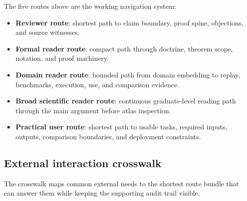 The five routes above are the working navigation system:
\begin{itemize}[leftmargin=1.6em,nosep]
\item \textbf{Reviewer route}: shortest path to claim boundary, proof spine,
      objections, and source witnesses.
\item \textbf{Formal reader route}: compact path through doctrine, theorem
      scope, notation, and proof machinery.
\item \textbf{Domain reader route}: bounded path from domain embedding to
      replay, benchmarks, execution, use, and comparison evidence.
\item \textbf{Broad scientific reader route}: continuous graduate-level reading path
      through the main argument before atlas inspection.
\item \textbf{Practical user route}: shortest path to usable tasks, required
      inputs, outputs, comparison boundaries, and deployment constraints.
\end{itemize}

\subsection{External interaction crosswalk}

The crosswalk maps common external needs to the shortest route bundle that can
answer them while keeping the supporting audit trail visible.

